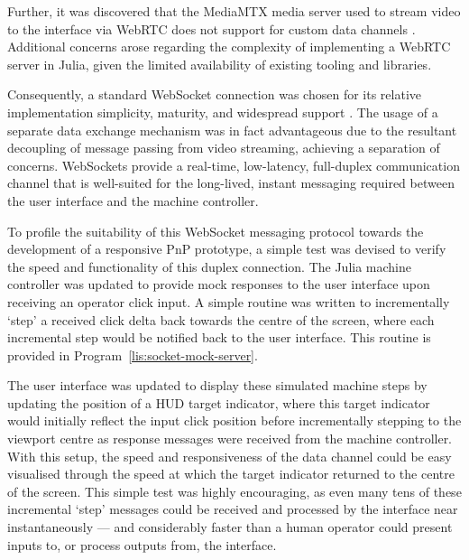 \documentclass[12pt,british,UKenglish]{article}
\begin{document}
Further, it was discovered that the MediaMTX media server used to stream video to the interface via \ac{WebRTC} does not support for custom data channels \cite{githubTransmittingData,githubDataChannel}.
Additional concerns arose regarding the complexity of implementing a \ac{WebRTC} server in Julia, given the limited availability of existing tooling and libraries.

Consequently, a standard WebSocket connection was chosen for its relative implementation simplicity, maturity, and widespread support \cite{MitrovicNikola2023IATO,mozillaWebSocketWebSockets}.
The usage of a separate data exchange mechanism was in fact advantageous due to the resultant decoupling of message passing from video streaming, achieving a separation of concerns.
WebSockets provide a real-time, low-latency, full-duplex communication channel \cite{6197172,OgundeyiK.E.2019Wirt} that is well-suited for the long-lived, instant messaging required between the user interface and the machine controller.

To profile the suitability of this WebSocket messaging protocol towards the development of a responsive \ac{PnP} prototype, a simple test was devised to verify the speed and functionality of this duplex connection.
The Julia machine controller was updated to provide mock responses to the user interface upon receiving an operator click input.
A simple routine was written to incrementally `step' a received click delta back towards the centre of the screen, where each incremental step would be notified back to the user interface.
This routine is provided in Program~\ref{lis:socket-mock-server}.

The user interface was updated to display these simulated machine steps by updating the position of a \acl*{HUD} target indicator, where this target indicator would initially reflect the input click position before incrementally stepping to the viewport centre as response messages were received from the machine controller.
With this setup, the speed and responsiveness of the data channel could be easy visualised through the speed at which the target indicator returned to the centre of the screen.
This simple test was highly encouraging, as even many tens of these incremental `step' messages could be received and processed by the interface near instantaneously --- and considerably faster than a human operator could present inputs to, or process outputs from, the interface.
\end{document}

